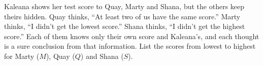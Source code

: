 Kaleana shows her test score to Quay, Marty and Shana, but the others keep theirs hidden. Quay thinks, ``At least two of us have the same score.'' Marty thinks, ``I didn't get the lowest score.'' Shana thinks, ``I didn't get the highest score.'' Each of them knows only their own score and Kaleana's, and each thought is a sure conclusion from that information. List the scores from lowest to highest for Marty ($M$), Quay ($Q$) and Shana ($S$).
